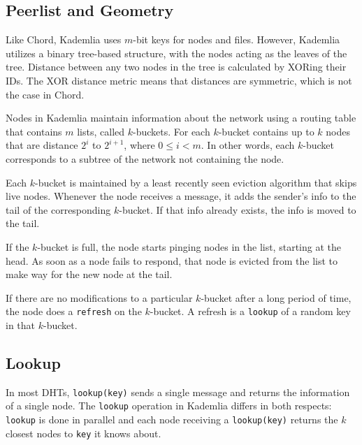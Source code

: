 \documentclass[10pt,letterpaper,twoside]{report}
\begin{document}

\subsection*{Peerlist and Geometry}
Like Chord, Kademlia uses $m$-bit keys for nodes and files.
However, Kademlia utilizes a binary tree-based structure, with the nodes acting as the leaves of the tree.
Distance between any two nodes in the tree  is calculated by XORing their IDs.
The XOR distance metric means that distances are symmetric, which is not the case in Chord.


Nodes in Kademlia maintain information about the network using a routing table that contains  $m$ lists, called $k$-buckets.
For each $k$-bucket contains up to $k$ nodes that are distance $2^i$ to $2^{i+1}$, where $0 \leq i < m$.
In other words, each $k$-bucket corresponds to a subtree of the network not containing the node.

Each $k$-bucket is maintained by a least recently seen eviction algorithm that skips live nodes.
Whenever the node receives a message, it adds the sender's info to the tail of the corresponding $k$-bucket.
If that info already exists, the info is moved to the tail.

If the $k$-bucket is full, the node starts pinging nodes in the list, starting at the head.
As soon as a node fails to respond, that node is evicted from the list to make way for the new node at the tail.

If there are no modifications to a particular $k$-bucket after a long period of time, the node does a \texttt{refresh} on the $k$-bucket.
A refresh is a \texttt{lookup} of a random key in that $k$-bucket.



\subsection*{Lookup}
In most DHTs, \texttt{lookup(key)} sends a single message and returns the information  of a single node.
The \texttt{lookup} operation in Kademlia differs in both respects:  \texttt{lookup} is done in parallel and each node receiving  a \texttt{lookup(key)} returns the $k$ closest nodes to \texttt{key} it knows about.
\end{document}
